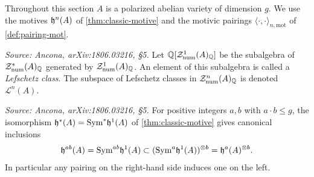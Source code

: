 Throughout this section \(A\) is a polarized abelian variety of dimension \(g\).
We use the motives \(\mathfrak{h}^n(A)\) of \cref{thm:classic-motive} and the motivic
pairings \(\langle \cdot, \cdot \rangle_{n,\mathrm{mot}}\) of
\cref{def:pairing-mot}.

\begin{definition}
  \label{def:lefschetz-class}
  \textit{Source: Ancona, arXiv:1806.03216, §5.}
  Let \(\mathbb{Q}[\mathcal{Z}^{1}_{\mathrm{num}}(A)_{\mathbb{Q}}]\) be the subalgebra of
  \(\mathcal{Z}^{*}_{\mathrm{num}}(A)_{\mathbb{Q}}\) generated by
  \(\mathcal{Z}^{1}_{\mathrm{num}}(A)_{\mathbb{Q}}\). An element of this subalgebra is called a
  \emph{Lefschetz class}. The subspace of Lefschetz classes in
  \(\mathcal{Z}^{n}_{\mathrm{num}}(A)_{\mathbb{Q}}\) is denoted \(\mathcal{L}^{n}(A)\).
\end{definition}

\begin{remark}
  \label{rem:sym-inclusion}
  \textit{Source: Ancona, arXiv:1806.03216, §5.}
  For positive integers \(a, b\) with \(a \cdot b \le g\), the isomorphism
  \(\mathfrak{h}^*(A) = \mathrm{Sym}^* \mathfrak{h}^1(A)\) of \cref{thm:classic-motive} gives canonical
  inclusions
  \[\mathfrak{h}^{a b}(A) = \mathrm{Sym}^{a b} \mathfrak{h}^1(A) \subset
    (\mathrm{Sym}^{a} \mathfrak{h}^1(A))^{\otimes b} = \mathfrak{h}^a(A)^{\otimes b}.\]
  In particular any pairing on the right-hand side induces one on the left.
\end{remark}

